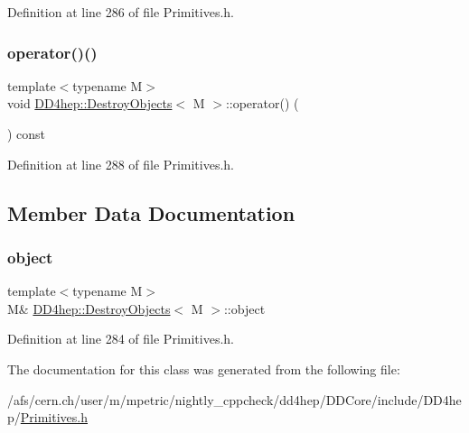 Definition at line 286 of file Primitives.\+h.

\hypertarget{class_d_d4hep_1_1_destroy_objects_ab7b9cf128c08ef8487521286fad76cc0}{}\label{class_d_d4hep_1_1_destroy_objects_ab7b9cf128c08ef8487521286fad76cc0} 
\subsubsection{\texorpdfstring{operator()()}{operator()()}\hspace{0.1cm}{\footnotesize\ttfamily [2/2]}}
{\footnotesize\ttfamily template$<$typename M$>$ \\
void \hyperlink{class_d_d4hep_1_1_destroy_objects}{D\+D4hep\+::\+Destroy\+Objects}$<$ M $>$\+::operator() (\begin{DoxyParamCaption}{ }\end{DoxyParamCaption}) const\hspace{0.3cm}{\ttfamily [inline]}}



Definition at line 288 of file Primitives.\+h.



\subsection{Member Data Documentation}
\hypertarget{class_d_d4hep_1_1_destroy_objects_a6561f28791b7de118aefc686be64c55d}{}\label{class_d_d4hep_1_1_destroy_objects_a6561f28791b7de118aefc686be64c55d} 
\subsubsection{\texorpdfstring{object}{object}}
{\footnotesize\ttfamily template$<$typename M$>$ \\
M\& \hyperlink{class_d_d4hep_1_1_destroy_objects}{D\+D4hep\+::\+Destroy\+Objects}$<$ M $>$\+::object}



Definition at line 284 of file Primitives.\+h.



The documentation for this class was generated from the following file\+:\begin{DoxyCompactItemize}
\item 
/afs/cern.\+ch/user/m/mpetric/nightly\+\_\+cppcheck/dd4hep/\+D\+D\+Core/include/\+D\+D4hep/\hyperlink{_primitives_8h}{Primitives.\+h}\end{DoxyCompactItemize}
